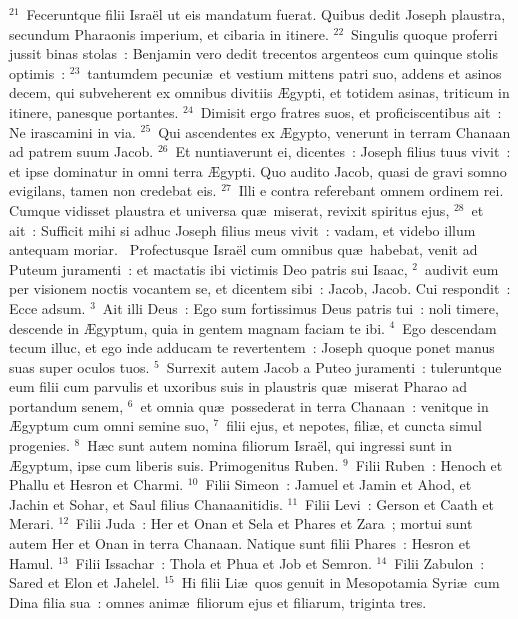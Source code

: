 ${}^{21}$~Feceruntque filii Isra\"el ut eis mandatum fuerat. Quibus dedit Joseph plaustra, secundum Pharaonis imperium, et cibaria in itinere.
${}^{22}$~Singulis quoque proferri jussit binas stolas~: Benjamin vero dedit trecentos argenteos cum quinque stolis optimis~:
${}^{23}$~tantumdem pecuni\ae\ et vestium mittens patri suo, addens et asinos decem, qui subveherent ex omnibus divitiis \AE gypti, et totidem asinas, triticum in itinere, panesque portantes.
${}^{24}$~Dimisit ergo fratres suos, et proficiscentibus ait~: Ne irascamini in via.
${}^{25}$~Qui ascendentes ex \AE gypto, venerunt in terram Chanaan ad patrem suum Jacob.
${}^{26}$~Et nuntiaverunt ei, dicentes~: Joseph filius tuus vivit~: et ipse dominatur in omni terra \AE gypti. Quo audito Jacob, quasi de gravi somno evigilans, tamen non credebat eis.
${}^{27}$~Illi e contra referebant omnem ordinem rei. Cumque vidisset plaustra et universa qu\ae\ miserat, revixit spiritus ejus,
${}^{28}$~et ait~: Sufficit mihi si adhuc Joseph filius meus vivit~: vadam, et videbo illum antequam moriar.
~Profectusque Isra\"el cum omnibus qu\ae\ habebat, venit ad Puteum juramenti~: et mactatis ibi victimis Deo patris sui Isaac,
${}^{2}$~audivit eum per visionem noctis vocantem se, et dicentem sibi~: Jacob, Jacob. Cui respondit~: Ecce adsum.
${}^{3}$~Ait illi Deus~: Ego sum fortissimus Deus patris tui~: noli timere, descende in \AE gyptum, quia in gentem magnam faciam te ibi.
${}^{4}$~Ego descendam tecum illuc, et ego inde adducam te revertentem~: Joseph quoque ponet manus suas super oculos tuos.
${}^{5}$~Surrexit autem Jacob a Puteo juramenti~: tuleruntque eum filii cum parvulis et uxoribus suis in plaustris qu\ae\ miserat Pharao ad portandum senem,
${}^{6}$~et omnia qu\ae\ possederat in terra Chanaan~: venitque in \AE gyptum cum omni semine suo,
${}^{7}$~filii ejus, et nepotes, fili\ae , et cuncta simul progenies.
${}^{8}$~H\ae c sunt autem nomina filiorum Isra\"el, qui ingressi sunt in \AE gyptum, ipse cum liberis suis. Primogenitus Ruben.
${}^{9}$~Filii Ruben~: Henoch et Phallu et Hesron et Charmi.
${}^{10}$~Filii Simeon~: Jamuel et Jamin et Ahod, et Jachin et Sohar, et Saul filius Chanaanitidis.
${}^{11}$~Filii Levi~: Gerson et Caath et Merari.
${}^{12}$~Filii Juda~: Her et Onan et Sela et Phares et Zara~; mortui sunt autem Her et Onan in terra Chanaan. Natique sunt filii Phares~: Hesron et Hamul.
${}^{13}$~Filii Issachar~: Thola et Phua et Job et Semron.
${}^{14}$~Filii Zabulon~: Sared et Elon et Jahelel.
${}^{15}$~Hi filii Li\ae\ quos genuit in Mesopotamia Syri\ae\ cum Dina filia sua~: omnes anim\ae\ filiorum ejus et filiarum, triginta tres.
